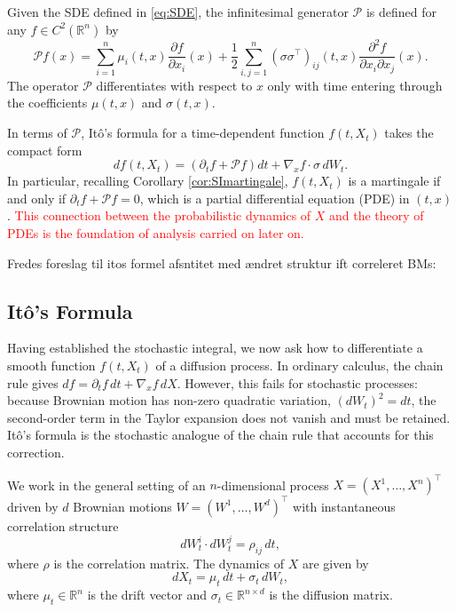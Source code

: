 \begin{definition}
Given the SDE defined in \eqref{eq:SDE}, the infinitesimal generator $\mathcal{P}$ is defined for any $f\in C^2(\mathbb{R}^n)$ by
\begin{equation}
    \mathcal{P}f(x) = \sum_{i=1}^n \mu_i(t,x) \frac{\partial f}{\partial x_i}(x) + \frac{1}{2} \sum_{i,j=1}^n (\sigma\sigma^\top)_{ij}(t,x) \frac{\partial^2 f}{\partial x_i \partial x_j}(x).
\end{equation}
The operator $\mathcal{P}$ differentiates with respect to $x$ only with time entering through the coefficients $\mu(t,x)$ and $\sigma(t,x)$.
\label{def:generator}
\end{definition}

In terms of $\mathcal{P}$, Itô's formula for a time-dependent function $f(t,X_t)$ takes the compact form 
\begin{equation}
    df(t, X_t) = \left(\partial_t f + \mathcal{P}f\right)dt + \nabla_x f \cdot \sigma\, dW_t.
\end{equation}
In particular, recalling Corollary \ref{cor:SImartingale}, $f(t,X_t)$ is a martingale if and only if $\partial_t f+\mathcal{P}f=0$, which is a partial differential equation (PDE) in $(t,x)$. \textcolor{red}{This connection between the probabilistic dynamics of $X$ and the theory of PDEs is the foundation of analysis carried on later on.}



Fredes foreslag til itos formel afsntitet med ændret struktur ift correleret BMs:

\subsection{Itô's Formula}

Having established the stochastic integral, we now ask how to 
differentiate a smooth function $f(t, X_t)$ of a diffusion process. 
In ordinary calculus, the chain rule gives 
$df = \partial_t f\,dt + \nabla_x f\,dX$. However, this fails for 
stochastic processes: because Brownian motion has non-zero quadratic 
variation, $(dW_t)^2 = dt$, the second-order term in the Taylor 
expansion does not vanish and must be retained. Itô's formula is the 
stochastic analogue of the chain rule that accounts for this correction.

We work in the general setting of an $n$-dimensional process 
$X = (X^1, \ldots, X^n)^\top$ driven by $d$ Brownian motions 
$W = (W^1, \ldots, W^d)^\top$ with instantaneous correlation structure
\begin{equation}
    dW^i_t \cdot dW^j_t = \rho_{ij}\,dt,
\end{equation}
where $\rho$ is the correlation matrix. The dynamics of $X$ are given by
\begin{equation}
    dX_t = \mu_t\,dt + \sigma_t\,dW_t,

\end{equation}
where $\mu_t \in \mathbb{R}^n$ is the drift vector and 
$\sigma_t \in \mathbb{R}^{n \times d}$ is the diffusion matrix.

